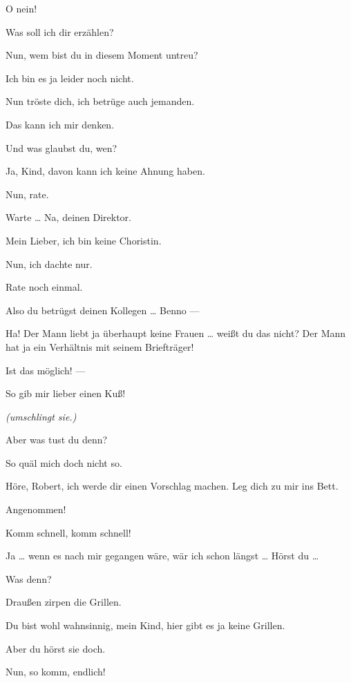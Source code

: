 \documentclass[
	final,
	a4paper,
	ngerman,
	mpinclude = true, %
	twoside = true,
	open = right,
	cleardoublepage = plain,
	DIV = 13,
	BCOR = 1cm,
	titlepage = firstiscover,
	]{scrbook}
\newcommand{\direction}[1]{\textit{(#1)}}
\newcommand{\thecharacter}[1]{\textup{\textsc{#1}}}
\newcommand{\thedichter}{\thecharacter{Dichter}}
\newcommand{\theschauspielerin}{\thecharacter{Schauspielerin}}
\newcommand{\character}[1]{\item[#1:]}
\newcommand{\dichter}{\character{\thedichter}}
\newcommand{\schauspielerin}{\character{\theschauspielerin}}
\begin{document}
\begin{play}
	\schauspielerin
	O nein!

	\dichter
	Was soll ich dir erzählen?

	\schauspielerin
	Nun, wem bist du in diesem Moment untreu?

	\dichter
	Ich bin es ja leider noch nicht.

	\schauspielerin
	Nun tröste dich, ich betrüge auch jemanden.

	\dichter
	Das kann ich mir denken.

	\schauspielerin
	Und was glaubst du, wen?

	\dichter
	Ja, Kind, davon kann ich keine Ahnung haben.

	\schauspielerin
	Nun, rate.

	\dichter
	Warte \ldots{} Na, deinen Direktor.

	\schauspielerin
	Mein Lieber, ich bin keine Choristin.

	\dichter
	Nun, ich dachte nur.

	\schauspielerin
	Rate noch einmal.

	\dichter
	Also du betrügst deinen Kollegen \ldots{} Benno ---

	\schauspielerin
	Ha! Der Mann liebt ja überhaupt keine Frauen \ldots{} weißt du das nicht? Der Mann hat ja ein Verhältnis mit seinem Briefträger!

	\dichter
	Ist das möglich! ---

	\schauspielerin
	So gib mir lieber einen Kuß!

	\dichter
	\direction{umschlingt sie.}

	\schauspielerin
	Aber was tust du denn?

	\dichter
	So quäl mich doch nicht so.

	\schauspielerin
	Höre, Robert, ich werde dir einen Vorschlag machen. Leg dich zu mir ins Bett.

	\dichter
	Angenommen!

	\schauspielerin
	Komm schnell, komm schnell!

	\dichter
	Ja \ldots{} wenn es nach mir gegangen wäre, wär ich schon längst \ldots{} Hörst du \ldots{}

	\schauspielerin
	Was denn?

	\dichter
	Draußen zirpen die Grillen.

	\schauspielerin
	Du bist wohl wahnsinnig, mein Kind, hier gibt es ja keine Grillen.

	\dichter
	Aber du hörst sie doch.

	\schauspielerin
	Nun, so komm, endlich!


\end{play}
\end{document}
